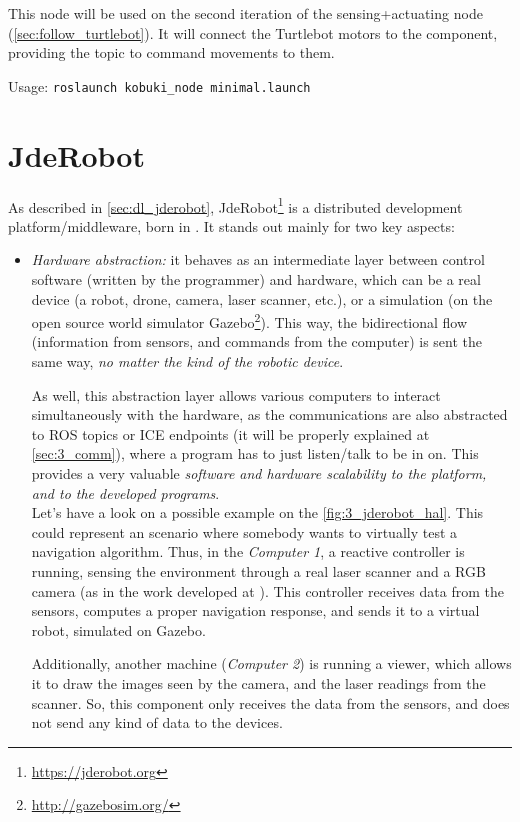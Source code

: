 		This node will be used on the second iteration of the sensing+actuating node (\autoref{sec:follow_turtlebot}). It will connect the Turtlebot motors to the component, providing the topic to command movements to them.
		
		\begin{center}
			Usage: \texttt{roslaunch kobuki\_node minimal.launch}
		\end{center}

	
\section{JdeRobot}
	As described in \autoref{sec:dl_jderobot}, JdeRobot\footnote{\url{https://jderobot.org}} is a distributed development platform/middleware, born in \cite{jmplaza-phd}. It stands out mainly for two key aspects:
	\begin{itemize}
		\item \textit{Hardware abstraction:} it behaves as an intermediate layer between control software (written by the programmer) and hardware, which can be a real device (a robot, drone, camera, laser scanner, etc.), or a simulation (on the open source world simulator Gazebo\footnote{\url{http://gazebosim.org/}}). This way, the bidirectional flow (information from sensors, and commands from the computer) is sent the same way, \textit{no matter the kind of the robotic device}.
		
		As well, this abstraction layer allows various computers to interact simultaneously with the hardware, as the communications are also abstracted to ROS topics or ICE endpoints (it will be properly explained at \autoref{sec:3_comm}), where a program has to just listen/talk to be in on. This provides a very valuable \textit{software and hardware scalability to the platform, and to the developed programs}.\\
		
		Let's have a look on a possible example on the \autoref{fig:3_jderobot_hal}. This could represent an scenario where somebody wants to virtually test a navigation algorithm. Thus, in the \emph{Computer 1}, a reactive controller is running, sensing the environment through a real laser scanner and a RGB camera (as in the work developed at \cite{rocapal}). This controller receives data from the sensors, computes a proper navigation response, and sends it to a virtual robot, simulated on Gazebo.
		
		Additionally, another machine (\emph{Computer 2}) is running a viewer, which allows it to draw the images seen by the camera, and the laser readings from the scanner. So, this component only receives the data from the sensors, and does not send any kind of data to the devices.
		

\end{itemize}
